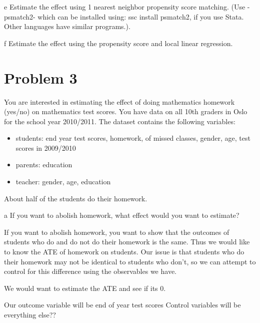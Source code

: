 \documentclass{article}
\begin{document}
\begin{problem}{e}
Estimate the effect using 1 nearest neighbor propensity score matching. (Use -psmatch2- which can be installed using: ssc install psmatch2, if you use Stata. Other languages have
similar programs.).
\end{problem}
\begin{solution}
\end{solution}

\begin{problem}{f}
Estimate the effect using the propensity score and local linear regression.
\end{problem}
\begin{solution}
\end{solution}

\newpage
\section*{Problem 3}
You are interested in estimating the effect of doing mathematics homework (yes/no) on mathematics test scores. You have data on all 10th graders in Oslo for the school year 2010/2011. The dataset contains the following variables:
\begin{itemize}
    \item students: end year test scores, homework, of missed classes, gender, age, test scores in 2009/2010
    \item parents: education
    \item teacher: gender, age, education
\end{itemize}
About half of the students do their homework.

\begin{problem}{a}
If you want to abolish homework, what effect would you want to estimate?
\end{problem}
\begin{solution}
If you want to abolish homework, you want to show that the outcomes of students who do and do not do their homework is the same. Thus we would like to know the ATE of homework on students. Our issue is that students who do their homework may not be identical to students who don't, so we can attempt to control for this difference using the observables we have.

We would want to estimate the ATE and see if its 0.

Our outcome variable will be end of year test scores
Control variables will be everything else??
\end{solution}
\end{document}
